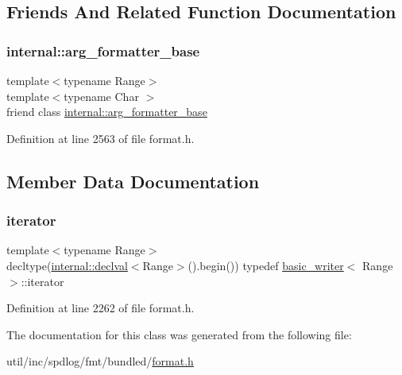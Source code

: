\subsection{Friends And Related Function Documentation}
\mbox{\label{classbasic__writer_a12c04f5659906e93c2418a4eb6358bd2}} 
\subsubsection{\texorpdfstring{internal\+::arg\+\_\+formatter\+\_\+base}{internal::arg\_formatter\_base}}
{\footnotesize\ttfamily template$<$typename Range$>$ \\
template$<$typename Char $>$ \\
friend class \hyperlink{classinternal_1_1arg__formatter__base}{internal\+::arg\+\_\+formatter\+\_\+base}\hspace{0.3cm}{\ttfamily [friend]}}



Definition at line 2563 of file format.\+h.



\subsection{Member Data Documentation}
\mbox{\label{classbasic__writer_a8e2b191740ebdbd67284ff5d5647ff62}} 
\subsubsection{\texorpdfstring{iterator}{iterator}}
{\footnotesize\ttfamily template$<$typename Range$>$ \\
decltype(\hyperlink{namespaceinternal_a5f61aadb1d6afc8b79ef7ea57c39eafc}{internal\+::declval}$<$Range$>$().begin()) typedef \hyperlink{classbasic__writer}{basic\+\_\+writer}$<$ Range $>$\+::iterator}



Definition at line 2262 of file format.\+h.



The documentation for this class was generated from the following file\+:\begin{DoxyCompactItemize}
\item 
util/inc/spdlog/fmt/bundled/\hyperlink{format_8h}{format.\+h}\end{DoxyCompactItemize}
